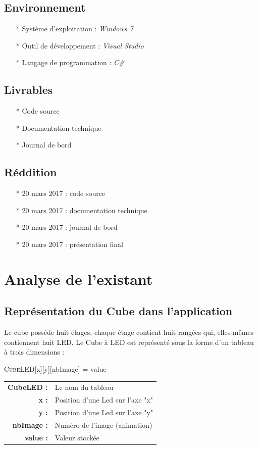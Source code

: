 \documentclass[a4paper,12pt]{article}
\begin{document}
\subsection{Environnement}
\begin{itemize}
	\item[*] Système d'exploitation : \emph{Windows 7}
	\item[*] Outil de développement : \emph{Visual Studio}
	\item[*] Langage de programmation : \emph{C\#}
\end{itemize}

\subsection{Livrables}
\begin{itemize}
	\item[*] Code source
	\item[*] Documentation technique
	\item[*] Journal de bord
\end{itemize}

\subsection{Réddition}
\begin{itemize}
	\item[*] 20 mars 2017 : code source
	\item[*] 20 mars 2017 : documentation technique
	\item[*] 20 mars 2017 : journal de bord
	\item[*] 20 mars 2017 : présentation final
\end{itemize}
\newpage

\section{Analyse de l'existant}
\subsection{Représentation du Cube dans l'application}
\noindent Le cube possède huit étages, chaque étage contient huit rangées qui, elles-mêmes contiennent huit LED. Le Cube à LED est représenté sous la forme d'un tableau à trois dimensions :
\begin{center}
	\textsc{CubeLED}[x][y][nbImage] = value
\end{center}
\begin{center}
\begin{tabular}{r  l}
	\raggedright{\textbf{CubeLED :}} & Le nom du tableau\\
	\textbf{x :} & Position d'une Led sur l'axe "x"\\
	\textbf{y :} & Position d'une Led sur l'axe "y"\\
	\textbf{nbImage :} & Numéro de l'image (animation)\\
	\textbf{value :} & Valeur stockée\\
\end{tabular}
\end{center}
\end{document}
